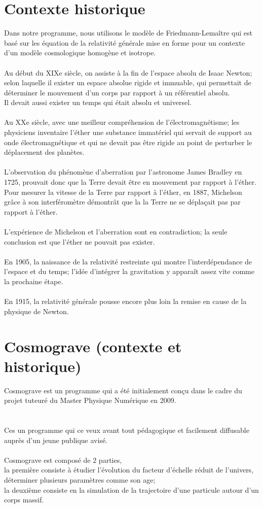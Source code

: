 \documentclass[12pt, a4paper]{report}
\begin{document}
\section{ Contexte historique}
Dans notre programme, nous utilisons le modèle de Friedmann-Lemaître qui est basé sur les équation de la relativité générale mise en forme pour un contexte d'un modèle cosmologique homogène et isotrope.\\ \\
Au début du XIXe siècle, on assiste à la fin de l'espace absolu de Isaac Newton; selon laquelle il exister un espace absolue rigide et immuable, qui permettait de déterminer le mouvement d'un corps par rapport à un référentiel absolu.\\ Il devait aussi exister un temps qui était absolu et universel\cite{Esslinger}.\\ \\
Au XXe siècle, avec une meilleur compréhension de l'électromagnétisme; les physiciens inventaire l’éther une substance immatériel qui servait de support au onde électromagnétique et qui ne devait pas être rigide au point de perturber le déplacement des planètes.\\ \\
L'observation du phénomène d'aberration par l'astronome James Bradley en 1725, prouvait donc que la Terre devait être en mouvement par rapport à l'éther.\\
Pour mesurer la vitesse de la Terre par rapport à l'éther, en 1887, Michelson grâce à son interféromètre démontrât que la la Terre ne se déplaçait pas par rapport à l'éther.\\ \\
L'expérience de Michelson et l'aberration sont en contradiction; la seule conclusion est que l'éther ne pouvait pas exister.\\ \\
En 1905, la naissance de la relativité restreinte qui montre l'interdépendance de l'espace et du temps; l'idée d'intégrer la gravitation y apparaît assez vite comme la prochaine étape.\\ \\
En 1915, la relativité générale pousse encore plus loin la remise en cause de la physique de Newton.

\section{ Cosmograve (contexte et historique)}
Cosmograve est un programme qui a été initialement conçu dans le cadre du projet tuteuré du Master Physique Numérique en 2009.\\ 
\\ \\
Ces un programme qui ce veux avant tout pédagogique et facilement diffusable auprès d'un jeune publique avisé.
\\ \\
Cosmograve est composé de 2 parties,\\ la première consiste à étudier l'évolution du facteur d'échelle réduit de l'univers, déterminer plusieurs paramètres comme son age;\\ la deuxième consiste en la simulation de la trajectoire d'une particule autour d'un corps massif.
\end{document}
